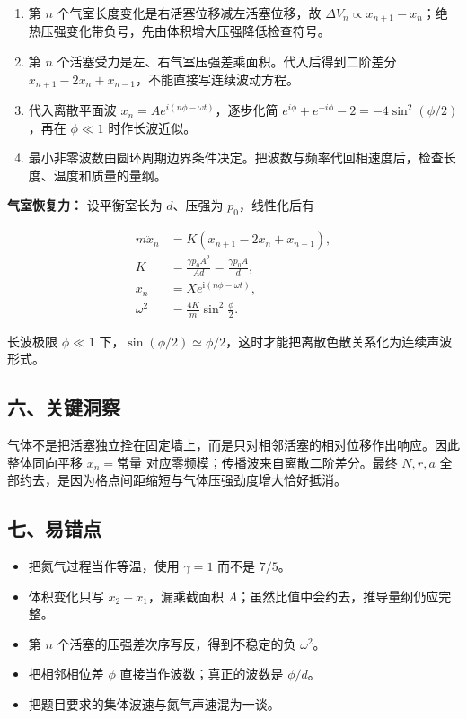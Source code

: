 \documentclass[12pt,a4paper,UTF8]{ctexart}
\newcommand{\tightlist}{\setlength{\itemsep}{0pt}\setlength{\parskip}{0pt}}
\begin{document}
\begin{enumerate}
\def\labelenumi{\arabic{enumi}.}
\tightlist
\item
  第 \(n\) 个气室长度变化是右活塞位移减左活塞位移，故
  \(\Delta V_n\propto x_{n+1}-x_n\)；绝热压强变化带负号，先由体积增大压强降低检查符号。
\item
  第 \(n\) 个活塞受力是左、右气室压强差乘面积。代入后得到二阶差分
  \(x_{n+1}-2x_n+x_{n-1}\)，不能直接写连续波动方程。
\item
  代入离散平面波 \(x_n=Ae^{i(n\phi-\omega t)}\)，逐步化简
  \(e^{i\phi}+e^{-i\phi}-2=-4\sin^2(\phi/2)\)，再在 \(\phi\ll1\)
  时作长波近似。
\item
  最小非零波数由圆环周期边界条件决定。把波数与频率代回相速度后，检查长度、温度和质量的量纲。
\end{enumerate}

\textbf{气室恢复力：} 设平衡室长为 \(d\)、压强为 \(p_0\)，线性化后有

\[\begin{aligned}
m\ddot x_n&=K(x_{n+1}-2x_n+x_{n-1}),\\
K&=\frac{\gamma p_0A^2}{Ad}=\frac{\gamma p_0A}{d},\\
x_n&=X e^{\mathrm i(n\phi-\omega t)},\\
\omega^2&=\frac{4K}{m}\sin^2\frac\phi2.
\end{aligned}\]

长波极限 \(\phi\ll1\)
下，\(\sin(\phi/2)\simeq\phi/2\)，这时才能把离散色散关系化为连续声波形式。

\subsection{六、关键洞察}\label{ux516dux5173ux952eux6d1eux5bdf-6}

气体不是把活塞独立拴在固定墙上，而是只对相邻活塞的相对位移作出响应。因此整体同向平移
\(x_n=\text{常量}\) 对应零频模；传播波来自离散二阶差分。最终 \(N,r,a\)
全部约去，是因为格点间距缩短与气体压强劲度增大恰好抵消。

\subsection{七、易错点}\label{ux4e03ux6613ux9519ux70b9-6}

\begin{itemize}
\tightlist
\item
  把氮气过程当作等温，使用 \(\gamma=1\) 而不是 \(7/5\)。
\item
  体积变化只写 \(x_2-x_1\)，漏乘截面积
  \(A\)；虽然比值中会约去，推导量纲仍应完整。
\item
  第 \(n\) 个活塞的压强差次序写反，得到不稳定的负 \(\omega^2\)。
\item
  把相邻相位差 \(\phi\) 直接当作波数；真正的波数是 \(\phi/d\)。
\item
  把题目要求的集体波速与氮气声速混为一谈。
\end{itemize}
\end{document}
